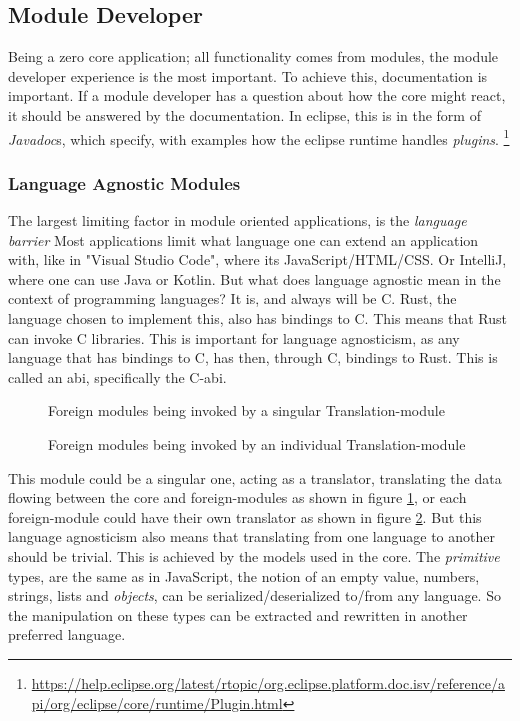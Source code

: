 \subsection{Module Developer}

Being a zero core application; all functionality comes from modules, the module
developer experience is the most important. To achieve this, documentation is
important. If a module developer has a question about how the core might react,
it should be answered by the documentation. In \gls{eclipse}, this is in the
form of \textit{Javadoc}s, which specify, with examples how the \gls{eclipse}
runtime handles \textit{plugins}. \footnote{\url{https://help.eclipse.org/latest/rtopic/org.eclipse.platform.doc.isv/reference/api/org/eclipse/core/runtime/Plugin.html}}

\subsubsection{Language Agnostic Modules}

The largest limiting factor in module oriented applications, is the
\textit{language barrier} Most applications limit what language one can extend
an application with, like in "Visual Studio Code", where its
JavaScript/HTML/CSS. Or IntelliJ, where one can use Java or Kotlin. But what
does language agnostic mean in the context of programming languages? It is, and
always will be C. Rust, the language chosen to implement this, also has bindings
to C. This means that Rust can invoke C libraries. This is important for
language agnosticism, as any language that has bindings to C, has then, through
C, bindings to Rust. This is called an \gls{abi}, specifically the C-\gls{abi}.

\begin{figure}
  \begin{center}
    
    \caption{Foreign modules being invoked by a singular Translation-module}
    \label{fig:fm1}
  \end{center}
\end{figure}

\begin{figure}
  \begin{center}
    
    \caption{Foreign modules being invoked by an individual Translation-module}
    \label{fig:fm2}
  \end{center}
\end{figure}

This module could be a singular one, acting as a translator, translating the
data flowing between the core and foreign-modules as shown in figure
\ref{fig:fm1}, or each foreign-module could have their own translator as shown
in figure \ref{fig:fm2}. But this language agnosticism also means that
translating from one language to another should be trivial. This is achieved by
the models used in the core. The \textit{primitive} types, are the same as in
JavaScript, the notion of an empty value, numbers, strings, lists and
\textit{objects}, can be serialized/deserialized to/from any language. So the
manipulation on these types can be extracted and rewritten in another preferred
language.


